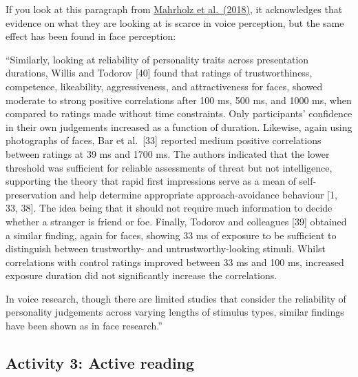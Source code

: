 \documentclass[
  english,
  letterpaper,
  DIV=11,
  numbers=noendperiod]{scrreprt}
\begin{document}
If you look at this paragraph from
\href{https://journals.plos.org/plosone/article?id=10.1371/journal.pone.0204991}{Mahrholz
et al.~(2018)}, it acknowledges that evidence on what they are looking
at is scarce in voice perception, but the same effect has been found in
face perception:

\begin{tcolorbox}[enhanced jigsaw, breakable, bottomtitle=1mm, leftrule=.75mm, opacityback=0, colbacktitle=quarto-callout-note-color!10!white, opacitybacktitle=0.6, toprule=.15mm, colback=white, left=2mm, coltitle=black, bottomrule=.15mm, titlerule=0mm, title={Drawing arguments from other topics}, toptitle=1mm, colframe=quarto-callout-note-color-frame, arc=.35mm, rightrule=.15mm]

``Similarly, looking at reliability of personality traits across
presentation durations, Willis and Todorov {[}40{]} found that ratings
of trustworthiness, competence, likeability, aggressiveness, and
attractiveness for faces, showed moderate to strong positive
correlations after 100 ms, 500 ms, and 1000 ms, when compared to ratings
made without time constraints. Only participants' confidence in their
own judgements increased as a function of duration. Likewise, again
using photographs of faces, Bar et al.~{[}33{]} reported medium positive
correlations between ratings at 39 ms and 1700 ms. The authors indicated
that the lower threshold was sufficient for reliable assessments of
threat but not intelligence, supporting the theory that rapid first
impressions serve as a mean of self-preservation and help determine
appropriate approach-avoidance behaviour {[}1, 33, 38{]}. The idea being
that it should not require much information to decide whether a stranger
is friend or foe. Finally, Todorov and colleagues {[}39{]} obtained a
similar finding, again for faces, showing 33 ms of exposure to be
sufficient to distinguish between trustworthy- and untrustworthy-looking
stimuli. Whilst correlations with control ratings improved between 33 ms
and 100 ms, increased exposure duration did not significantly increase
the correlations.

In voice research, though there are limited studies that consider the
reliability of personality judgements across varying lengths of stimulus
types, similar findings have been shown as in face research.''

\end{tcolorbox}

\subsection{Activity 3: Active reading}\label{activity-3-active-reading}
\end{document}
